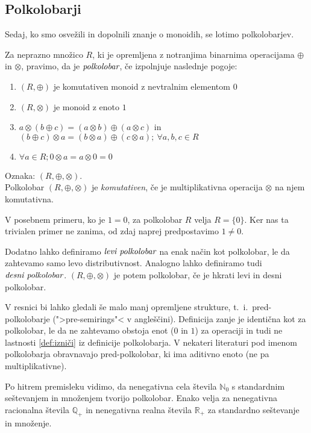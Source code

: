 \documentclass[mat1]{fmfdelo}
\newcommand{\N}{\mathbb{N}}
\newcommand{\No}{\N_0}
\newcommand{\Pplus}[1]{\mathbb{#1}_{+}}
\newcommand{\pojem}[1]{\ensuremath{\emph{#1}}}
\begin{document}
\subsection{Polkolobarji} \label{subsect:semiring}
Sedaj, ko smo osvežili in dopolnili znanje o monoidih, se lotimo polkolobarjev.
\begin{definicija}
	Za neprazno množico $R$, ki je opremljena z notranjima binarnima operacijama $\oplus$ in $\otimes$, pravimo, da je \pojem{polkolobar}, če izpolnjuje naslednje pogoje:
	\begin{enumerate}
		\item $(R, \oplus)$ je komutativen monoid z nevtralnim elementom $0$
		\item $(R, \otimes)$ je monoid z enoto $1$
		\item $a\otimes(b \oplus c) = (a\otimes b) \oplus (a\otimes c)$ in $(b \oplus c)\otimes a = (b\otimes a) \oplus (c\otimes a);~\forall a, b, c\in R$
		\item  \label{def:izniči} $\forall a\in R; 0 \otimes a = a\otimes 0 = 0$
	\end{enumerate}
	Oznaka: $(R, \oplus, \otimes)$. \\ Polkolobar $(R, \oplus, \otimes)$ je \textit{komutativen}, če je multiplikativna operacija $\otimes$ na njem komutativna.
\end{definicija}
V posebnem primeru, ko je $1 = 0$, za polkolobar $R$ velja $R = \{0\}$. Ker nas ta trivialen primer ne zanima, od zdaj naprej predpostavimo $1 \neq 0$.
\begin{opomba}
	Dodatno lahko definiramo \pojem{levi polkolobar} na enak način kot polkolobar, le da zahtevamo samo levo distributivnost. Analogno lahko definiramo tudi \pojem{desni polkolobar}. $(R,\oplus, \otimes)$ je potem polkolobar, če je hkrati levi in desni polkolobar.
\end{opomba}
\begin{opomba}
	V resnici bi lahko gledali še malo manj opremljene strukture, t.~i.~pred-polkolobarje (">pre-semirings"< v angleščini). Definicija zanje je identična kot za polkolobar, le da ne zahtevamo obstoja enot ($0$ in $1$) za operaciji in tudi ne lastnosti \ref{def:izniči} iz definicije polkolobarja. V nekateri literaturi pod imenom polkolobarja obravnavajo pred-polkolobar, ki ima aditivno enoto (ne pa multiplikativne).
\end{opomba}

Po hitrem premisleku vidimo, da nenegativna cela števila $\No$ s standardnim seštevanjem in množenjem tvorijo polkolobar. Enako velja za nenegativna racionalna števila $\Pplus{Q}$ in nenegativna realna števila $\Pplus{R}$ za standardno seštevanje in množenje.
\end{document}
